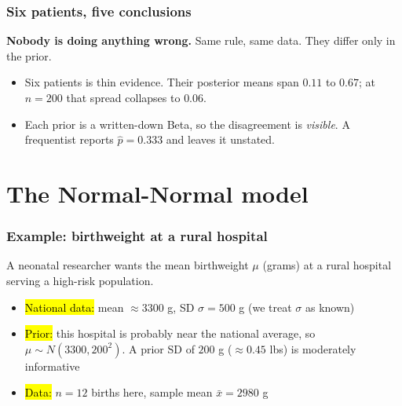 \documentclass[slidestop,compress,mathserif]{beamer}
\begin{document}
\begin{frame}
\frametitle{Six patients, five conclusions}

\textbf{Nobody is doing anything wrong.} Same rule, same data. They differ only in the prior.

\pause
\begin{itemize}
\item Six patients is thin evidence. Their posterior means span $0.11$ to $0.67$; at $n = 200$ that spread collapses to $0.06$.
\pause
\item Each prior is a written-down Beta, so the disagreement is \emph{visible}. A frequentist reports $\hat p = 0.333$ and leaves it unstated.
\end{itemize}

\pause
{}

\end{frame}

\section{The Normal-Normal model}

\begin{frame}
\frametitle{Example: birthweight at a rural hospital}

A neonatal researcher wants the mean birthweight $\mu$ (grams) at a rural hospital serving a high-risk population.

\pause
\medskip
\begin{itemize}
\item \hl{National data:} mean $\approx 3300$ g, SD $\sigma = 500$ g \quad (we treat $\sigma$ as known)
\pause
\item \hl{Prior:} this hospital is probably near the national average, so $\mu \sim N(3300, 200^2)$. A prior SD of $200$ g ($\approx 0.45$ lbs) is moderately informative
\pause
\item \hl{Data:} $n = 12$ births here, sample mean $\bar{x} = 2980$ g
\end{itemize}

\pause
\medskip
{}

\end{frame}
\end{document}
